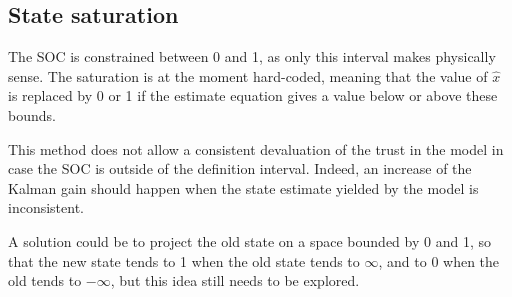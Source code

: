 \documentclass{article}
\begin{document}
\subsection{State saturation}
The SOC is constrained between 0 and 1, as only this interval makes physically sense. The saturation is at the moment hard-coded, meaning that the value of $\hat{x}$ is replaced by 0 or 1 if the estimate equation gives a value below or above these bounds.

This method does not allow a consistent devaluation of the trust in the model in case the SOC is outside of the definition interval. Indeed, an increase of the Kalman gain should happen when the state estimate yielded by the model is inconsistent. 

A solution could be to project the old state on a space bounded by 0 and 1, so that the new state tends to 1 when the old state tends to $\infty$, and to 0 when the old tends to $-\infty$, but this idea still needs to be explored. 
\end{document}
